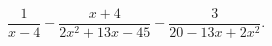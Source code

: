\begin{ex}[type=equation]
	\begin{condition}
		$\dfrac{1}{x - 4} - \dfrac{x + 4}{2x^2 +13x - 45} - \dfrac{3}{20 - 13x + 2x^2}.$
	\end{condition}
\end{ex}